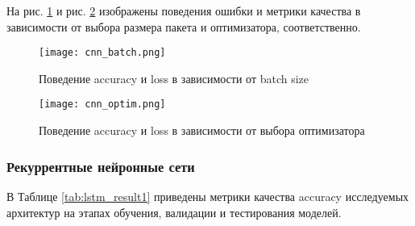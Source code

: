 На рис. \ref{fig:cnn_batch} и рис. \ref{fig:cnn_optimizer} изображены поведения ошибки и метрики качества в зависимости от выбора размера пакета и оптимизатора, соответственно.
\begin{figure}[H]
    \centering
    \texttt{[image: cnn\_batch.png]}
    \caption{Поведение accuracy и loss в зависимости от batch size}
    \label{fig:cnn_batch}
\end{figure}
\begin{figure}[H]
    \centering
    \texttt{[image: cnn\_optim.png]}
    \caption{Поведение accuracy и loss в зависимости от выбора оптимизатора}
    \label{fig:cnn_optimizer}
\end{figure}
\subsubsection{Рекуррентные нейронные сети}
В Таблице \ref{tab:lstm_result1} приведены метрики качества accuracy исследуемых архитектур на этапах обучения, валидации и тестирования моделей. 
